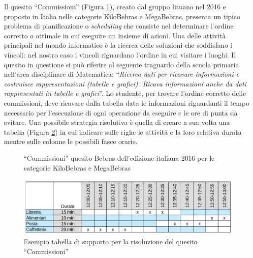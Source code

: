 \documentclass[12pt]{report}
\begin{document}
\newpage
Il quesito ``Commissioni'' (Figura \ref{fig:corrispondenze1}), creato dal gruppo lituano nel 2016 e proposto in Italia nelle categorie KiloBebras e MegaBebras, presenta un tipico problema di pianificazione o \textit{scheduling} che consiste nel determinare l'ordine corretto o ottimale in cui eseguire un insieme di azioni. Una delle attività principali nel mondo informatico è la ricerca delle soluzioni che soddisfano i vincoli: nel nostro caso i vincoli riguardano l'ordine in cui visitare i luoghi.
Il quesito in questione si può riferire al seguente traguardo della scuola primaria nell'area disciplinare di Matematica:
``\textit{Ricerca dati per ricavare informazioni e costruisce rappresentazioni (tabelle e grafici). Ricava informazioni anche da dati rappresentati in tabelle e grafici}''.
Lo studente, per trovare l'ordine corretto delle commissioni, deve ricavare dalla tabella data le informazioni riguardanti il tempo necessario per l'esecuzione di ogni operazione da eseguire e le ore di punta da evitare. Una possibile strategia risolutiva è quella di creare a sua volta una tabella (Figura \ref{fig:corrispondenze2}) in cui indicare sulle righe le attività e la loro relativa durata mentre sulle colonne le possibili fasce orarie.


\begin{figure}[H]
	\centering
	\caption{``Commissioni'' quesito Bebras dell'edizione italiana 2016 per le categorie KiloBebras e MegaBebras}\label{fig:corrispondenze1}
\end{figure}

\begin{figure}[H]
	\centering
	\includegraphics[width=15.0cm]{./immagini/02_Cap2/corrispondenze2}
	\caption{Esempio tabella di supporto per la risoluzione del quesito ``Commissioni''}\label{fig:corrispondenze2}
\end{figure}
\end{document}
